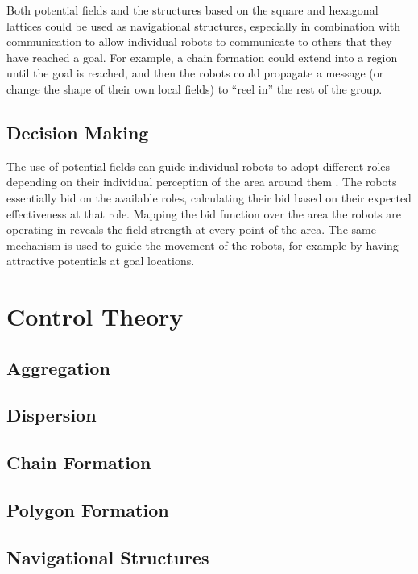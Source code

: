 \documentclass[]{article}
\begin{document}
Both potential fields and the structures based on the square and hexagonal lattices could be used as navigational structures, especially in combination with communication to allow individual robots to communicate to others that they have reached a goal. 
For example, a chain formation could extend into a region until the goal is reached, and then the robots could propagate a message (or change the shape of their own local fields) to ``reel in'' the rest of the group. 

\subsection{Decision Making}

The use of potential fields can guide individual robots to adopt different roles depending on their individual perception of the area around them \cite{vail2003multi}.
The robots essentially bid on the available roles, calculating their bid based on their expected effectiveness at that role. 
Mapping the bid function over the area the robots are operating in reveals the field strength at every point of the area. 
The same mechanism is used to guide the movement of the robots, for example by having attractive potentials at goal locations. 

\section{Control Theory}

\subsection{Aggregation}

\subsection{Dispersion}

\subsection{Chain Formation}

\subsection{Polygon Formation}

\subsection{Navigational Structures}
\end{document}
